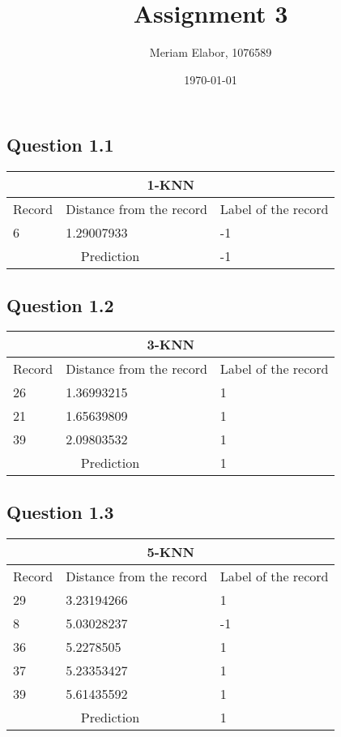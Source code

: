 \documentclass[10pt]{article}
\title{Assignment 3}
\author{Meriam Elabor, 1076589}
\date{\today}
\begin{document}
\maketitle
\subsection*{Question 1.1}
\begin{tabular}{ 
|p{3cm}||p{3cm}|p{3cm}|  }
 \hline
 \multicolumn{3}{|c|}{1-KNN} \\
 \hline
 Record & Distance from the record& Label of the record\\
 \hline
 6 & 1.29007933 & -1\\
 \hline
 \multicolumn{2}{|c|}{Prediction} & -1\\
 \hline
 
\end{tabular}

\bigskip
\subsection*{Question 1.2}
\begin{tabular}{ 
|p{3cm}||p{3cm}|p{3cm}|  }
 \hline
 \multicolumn{3}{|c|}{3-KNN} \\
 \hline
 
 Record & Distance from the record& Label of the record\\
 \hline
 26&1.36993215&1\\
 21&1.65639809&1\\
 39&2.09803532&1\\
 \hline
 \multicolumn{2}{|c|}{Prediction} & 1\\
 \hline
 
\end{tabular}

\bigskip

\subsection*{Question 1.3}
\begin{tabular}{ 
|p{3cm}||p{3cm}|p{3cm}|  }
 \hline
 \multicolumn{3}{|c|}{5-KNN} \\
 \hline
 
 Record & Distance from the record& Label of the record\\
 \hline
 29&3.23194266&1\\
 8&5.03028237&-1\\
 36&5.2278505&1\\
 37&5.23353427&1\\
 39&5.61435592&1\\
 \hline
 \multicolumn{2}{|c|}{Prediction} & 1\\
 \hline
 
\end{tabular}
\end{document}
